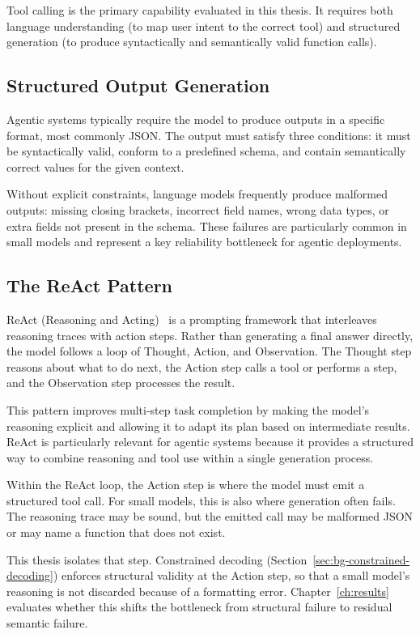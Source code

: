 Tool calling is the primary capability evaluated in this thesis. It requires both language understanding (to map user intent to the correct tool) and structured generation (to produce syntactically and semantically valid function calls).

\subsection{Structured Output Generation}

Agentic systems typically require the model to produce outputs in a specific format, most commonly JSON. The output must satisfy three conditions: it must be syntactically valid, conform to a predefined schema, and contain semantically correct values for the given context.

Without explicit constraints, language models frequently produce malformed outputs: missing closing brackets, incorrect field names, wrong data types, or extra fields not present in the schema. These failures are particularly common in small models and represent a key reliability bottleneck for agentic deployments.

\subsection{The ReAct Pattern}

ReAct (Reasoning and Acting)~\cite{yao2023react} is a prompting framework that interleaves reasoning traces with action steps. Rather than generating a final answer directly, the model follows a loop of Thought, Action, and Observation. The Thought step reasons about what to do next, the Action step calls a tool or performs a step, and the Observation step processes the result.

This pattern improves multi-step task completion by making the model's reasoning explicit and allowing it to adapt its plan based on intermediate results. ReAct is particularly relevant for agentic systems because it provides a structured way to combine reasoning and tool use within a single generation process.

Within the ReAct loop, the Action step is where the model must emit a structured tool call. For small models, this is also where generation often fails. The reasoning trace may be sound, but the emitted call may be malformed JSON or may name a function that does not exist.

This thesis isolates that step. Constrained decoding (Section~\ref{sec:bg-constrained-decoding}) enforces structural validity at the Action step, so that a small model's reasoning is not discarded because of a formatting error. Chapter~\ref{ch:results} evaluates whether this shifts the bottleneck from structural failure to residual semantic failure.

